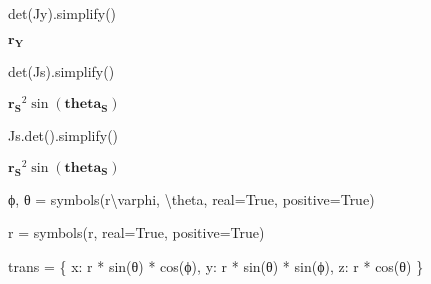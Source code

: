 \documentclass[
  a4paper,
  DIV=11,
  numbers=noendperiod]{scrreprt}
\newenvironment{Shaded}{\begin{snugshade}}{\end{snugshade}}
\newcommand{\NormalTok}[1]{\textcolor[rgb]{0.00,0.23,0.31}{#1}}
\newcommand{\OperatorTok}[1]{\textcolor[rgb]{0.37,0.37,0.37}{#1}}
\newcommand{\StringTok}[1]{\textcolor[rgb]{0.13,0.47,0.30}{#1}}
\newcommand{\VariableTok}[1]{\textcolor[rgb]{0.07,0.07,0.07}{#1}}
\newcommand{\VerbatimStringTok}[1]{\textcolor[rgb]{0.13,0.47,0.30}{#1}}
\begin{document}
\begin{Shaded}
\begin{Highlighting}[]
\NormalTok{det(Jy).simplify()}
\end{Highlighting}
\end{Shaded}

$\displaystyle \mathbf{{r}_{Y}}$

\begin{Shaded}
\begin{Highlighting}[]
\NormalTok{det(Js).simplify()}
\end{Highlighting}
\end{Shaded}

$\displaystyle \mathbf{{r}_{S}}^{2} \sin{\left(\mathbf{{theta}_{S}} \right)}$

\begin{Shaded}
\begin{Highlighting}[]
\NormalTok{Js.det().simplify()}
\end{Highlighting}
\end{Shaded}

$\displaystyle \mathbf{{r}_{S}}^{2} \sin{\left(\mathbf{{theta}_{S}} \right)}$

\href{https://mzucker.github.io/2018/04/12/sympy-part-3-moar-derivatives.html}{}

\begin{Shaded}
\begin{Highlighting}[]
\NormalTok{ϕ, θ }\OperatorTok{=}\NormalTok{ symbols(}\VerbatimStringTok{r\textquotesingle{}\textbackslash{}varphi, \textbackslash{}theta\textquotesingle{}}\NormalTok{, real}\OperatorTok{=}\VariableTok{True}\NormalTok{, positive}\OperatorTok{=}\VariableTok{True}\NormalTok{)}
\end{Highlighting}
\end{Shaded}

\begin{Shaded}
\begin{Highlighting}[]
\NormalTok{r }\OperatorTok{=}\NormalTok{ symbols(}\StringTok{\textquotesingle{}r\textquotesingle{}}\NormalTok{, real}\OperatorTok{=}\VariableTok{True}\NormalTok{, positive}\OperatorTok{=}\VariableTok{True}\NormalTok{)}
\end{Highlighting}
\end{Shaded}

\begin{Shaded}
\begin{Highlighting}[]
\NormalTok{trans }\OperatorTok{=}\NormalTok{ \{}
\NormalTok{    x: r }\OperatorTok{*}\NormalTok{ sin(θ) }\OperatorTok{*}\NormalTok{ cos(ϕ),}
\NormalTok{    y: r }\OperatorTok{*}\NormalTok{ sin(θ) }\OperatorTok{*}\NormalTok{ sin(ϕ),}
\NormalTok{    z: r }\OperatorTok{*}\NormalTok{ cos(θ)}
\NormalTok{\}}
\end{Highlighting}
\end{Shaded}
\end{document}
